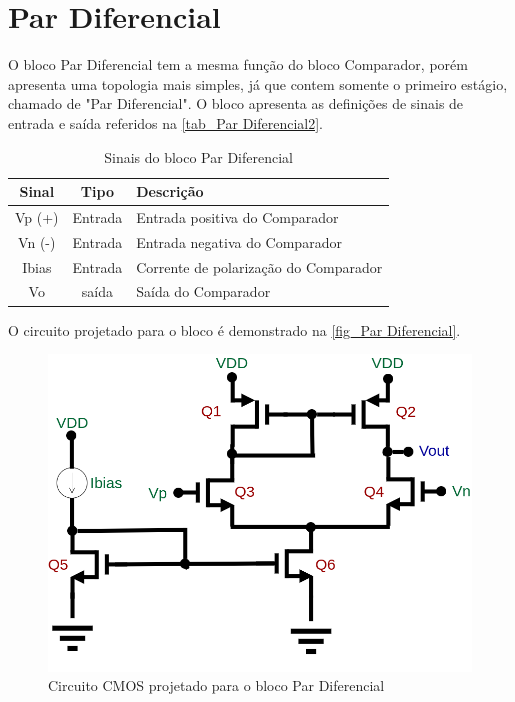 \renewcommand{\NomeBloco}{Par Diferencial}
\renewcommand{\NomePTab}{tab_\NomeBloco}
\renewcommand{\NomeSTab}{tab_\NomeBloco2}
\renewcommand{\NomePFig}{fig_\NomeBloco}
\renewcommand{\NomeSFig}{fig_\NomeBloco2}
\renewcommand{\NomeTTab}{tab_\NomeBloco3}
\renewcommand{\NomeQTab}{tab_\NomeBloco4}

\section{\NomeBloco}

O bloco \NomeBloco{} tem a mesma fun{\c c}\~ao do bloco Comparador, por\'em apresenta uma topologia mais simples, j\'a que contem somente o primeiro est\'agio, chamado de "Par Diferencial". O bloco apresenta as defini{\c c}\~oes de sinais de entrada e sa\'ida referidos na \autoref{\NomeSTab}.

\begin{table}[htbp]
\caption{Sinais do bloco \NomeBloco}
\label{\NomeSTab}
\centering
\begin{tabular}{ccl}

    \toprule
    Sinal & Tipo    & Descri{\c c}\~ao        \\
    \midrule \midrule
    Vp (+) & Entrada & Entrada positiva do Comparador\\
    \midrule
    Vn (-) & Entrada & Entrada negativa do Comparador\\
    \midrule
    Ibias & Entrada & Corrente de polariza{\c c}\~ao do Comparador\\
    \midrule
    Vo & sa\'ida & Sa\'ida do Comparador\\
    \bottomrule
\end{tabular}
\end{table}

O circuito projetado para o bloco \'e demonstrado na \autoref{\NomePFig}.

\begin{figure}[htb]
 \label{\NomePFig}
 \centering
    \centering
    \caption{Circuito CMOS projetado para o bloco \NomeBloco} 
    \includegraphics[scale=0.4]{Circuitos/diff_pair.png}
\end{figure}


